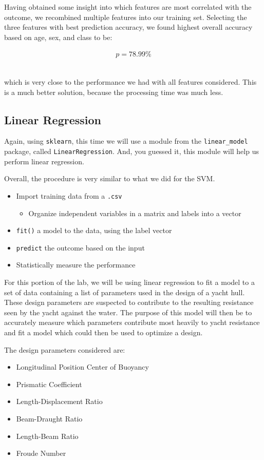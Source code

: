 \documentclass[11pt,a4paper]{article}
\begin{document}
Having obtained some insight into which features are most correlated with the outcome, we recombined multiple features into our training set. Selecting the three features with best prediction accuracy, we found highest overall accuracy based on age, sex, and class to be:

\begin{align*}
p = 78.99\%
\end{align*}\

which is very close to the performance we had with all features considered. This is a much better solution, because the processing time was much less.

\clearpage

\subsection{Linear Regression}
Again, using \verb|sklearn|, this time we will use a module from the \verb|linear_model| package, called \verb|LinearRegression|. And, you guessed it, this module will help us perform linear regression. 

Overall, the procedure is very similar to what we did for the SVM.

\begin{itemize}
\item Import training data from a \verb|.csv|
	\begin{itemize}
		\item Organize independent variables in a matrix and labels into a vector
	\end{itemize}
\item \verb|fit()| a model to the data, using the label vector
\item \verb|predict| the outcome based on the input
\item Statistically measure the performance
\end{itemize}

For this portion of the lab, we will be using linear regression to fit a model to a set of data containing a list of parameters used in the design of a yacht hull. These design parameters are suspected to contribute to the resulting resistance seen by the yacht against the water. The purpose of this model will then be to accurately measure which parameters contribute most heavily to yacht resistance and fit a model which could then be used to optimize a design.

The design parameters considered are:

\begin{itemize}
\item Longitudinal Position Center of Buoyancy
\item Prismatic Coefficient
\item Length-Displacement Ratio
\item Beam-Draught Ratio
\item Length-Beam Ratio
\item Froude Number
\end{itemize}
\end{document}
